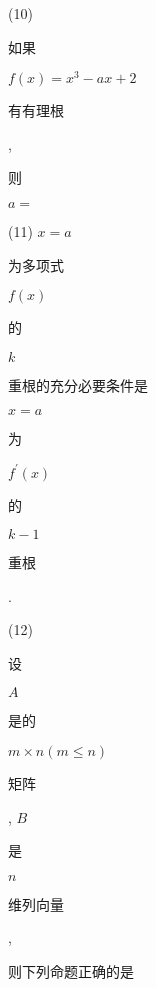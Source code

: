 \documentclass[10pt]{article}
\begin{document}
(10) \begin{CJK}{UTF8}{mj}如果\end{CJK} $f(x)=x^{3}-a x+2$ \begin{CJK}{UTF8}{mj}有有理根\end{CJK}, \begin{CJK}{UTF8}{mj}则\end{CJK} $a=$

(11) $x=a$ \begin{CJK}{UTF8}{mj}为多项式\end{CJK} $f(x)$ \begin{CJK}{UTF8}{mj}的\end{CJK} $k$ \begin{CJK}{UTF8}{mj}重根的充分必要条件是\end{CJK} $x=a$ \begin{CJK}{UTF8}{mj}为\end{CJK} $f^{\prime}(x)$ \begin{CJK}{UTF8}{mj}的\end{CJK} $k-1$ \begin{CJK}{UTF8}{mj}重根\end{CJK}.

(12) \begin{CJK}{UTF8}{mj}设\end{CJK} $A$ \begin{CJK}{UTF8}{mj}是的\end{CJK} $m \times n(m \leqslant n)$ \begin{CJK}{UTF8}{mj}矩阵\end{CJK}, $B$ \begin{CJK}{UTF8}{mj}是\end{CJK} $n$ \begin{CJK}{UTF8}{mj}维列向量\end{CJK}, \begin{CJK}{UTF8}{mj}则下列命题正确的是\end{CJK}
\end{document}
